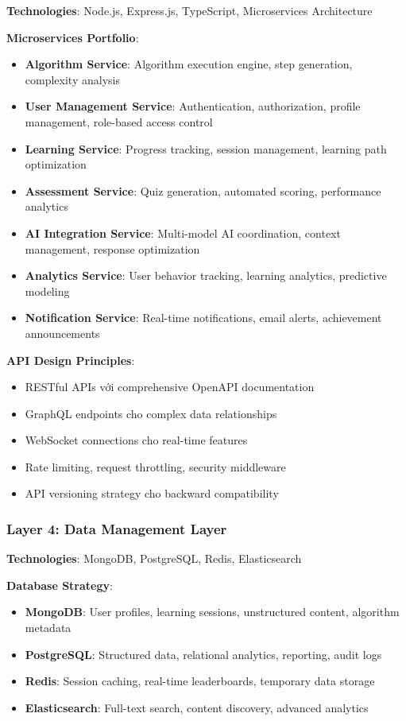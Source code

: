 \textbf{Technologies}: Node.js, Express.js, TypeScript, Microservices Architecture

\textbf{Microservices Portfolio}:
\begin{itemize}
    \item \textbf{Algorithm Service}: Algorithm execution engine, step generation, complexity analysis
    \item \textbf{User Management Service}: Authentication, authorization, profile management, role-based access control
    \item \textbf{Learning Service}: Progress tracking, session management, learning path optimization
    \item \textbf{Assessment Service}: Quiz generation, automated scoring, performance analytics
    \item \textbf{AI Integration Service}: Multi-model AI coordination, context management, response optimization
    \item \textbf{Analytics Service}: User behavior tracking, learning analytics, predictive modeling
    \item \textbf{Notification Service}: Real-time notifications, email alerts, achievement announcements
\end{itemize}

\textbf{API Design Principles}:
\begin{itemize}
    \item RESTful APIs với comprehensive OpenAPI documentation
    \item GraphQL endpoints cho complex data relationships
    \item WebSocket connections cho real-time features
    \item Rate limiting, request throttling, security middleware
    \item API versioning strategy cho backward compatibility
\end{itemize}

\subsubsection{Layer 4: Data Management Layer}

\textbf{Technologies}: MongoDB, PostgreSQL, Redis, Elasticsearch

\textbf{Database Strategy}:
\begin{itemize}
    \item \textbf{MongoDB}: User profiles, learning sessions, unstructured content, algorithm metadata
    \item \textbf{PostgreSQL}: Structured data, relational analytics, reporting, audit logs
    \item \textbf{Redis}: Session caching, real-time leaderboards, temporary data storage
    \item \textbf{Elasticsearch}: Full-text search, content discovery, advanced analytics
\end{itemize}

